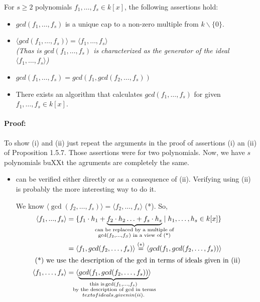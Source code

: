 \begin{proposition}[title = Proposition 1.5.9]
    For $s \geq 2$ polynomials $f_1, \ldots, f_s \in k[x]$, the following assertions hold:
    \begin{itemize}
      \item[(i)] $gcd(f_1, \ldots, f_s)$ is a unique cap to a non-zero multiple from $k\backslash\{0\}$. 
      \item[(ii)] $\langle gcd(f_1, \ldots, f_s) \rangle = \langle f_1, \ldots, f_s \rangle$\\
      \textit{\textcolor{airforceblue}{(Thas is $gcd(f_1, \ldots, f_s)$ is characterized as the generator of the ideal $\langle f_1, \ldots, f_s \rangle$)}}
      \item[(iii)] $gcd(f_1, \ldots, f_s) = gcd(f_1, gcd(f_2, \ldots, f_s))$ 
      \item[(iv)] There exists an algorithm that calculates $gcd(f_1, \ldots, f_s)$ for given $f_1, \ldots, f_s \in k[x]$.  
    \end{itemize} 

    \paragraph{Proof:} To show (i) and (ii) just repeat the arguments in the proof of assertions (i) an (ii) of Proposition 1.5.7. Those assertions were for two polynomials. 
    Now, we have $s$ polynomials buXXt the agruments are completely the same. 
    \begin{itemize}
      \item[(iii)] can be verified either directly or as a consequence of (ii). Verifying using (ii) is probably the more interesting way to do it. 
      
      We know $\langle \gcd(f_2, \ldots, f_s) \rangle = \langle f_2, \ldots, f_s \rangle$ (*). So, 
      \begin{align*}
        \langle f_1, ..., f_s \rangle 
        & = \{f_1 \cdot h_1 + \underbrace{f_2 \cdot h_2 \ldots + f_s \cdot h_s}_{
          \mathclap{
            \substack{
                \text{ can be replaced by a multiple of }
              \\
                \gcd(f_2, \ldots, f_S) \text{ in a view of (*)}
          }}} \mid h_1, \ldots, h_s \in k[x]
        \} \\
        & = \langle f_1, gcd(f_2, \ldots, f_s) \rangle \stackrel{(*)}{=}  \langle gcd(f_1, gcd(f_2, \ldots, f_s)) \rangle \\ 
        \intertext{ (*) we use the description of the gcd in terms of ideals given in (ii)}
        \langle f_1, \ldots, f_s \rangle &= \langle \underbrace{gcd(f_1, gcd(f_2, \ldots, f_s))}_{
          \mathclap{
            \substack{
              \text{this is} \gcd(f_1, \ldots,f_s) \\ \text{ by the description of gcd in terms} \\ text{of ideals, given in (ii).}
            }
          }
        } \rangle
      \end{align*}
    \end{itemize}


\end{proposition}
